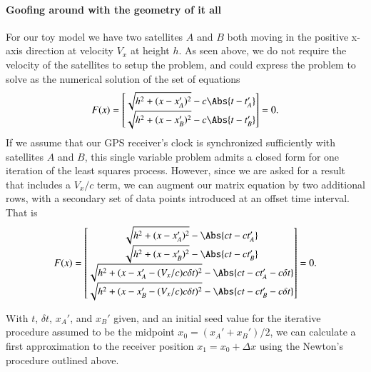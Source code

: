 \paragraph{Goofing around with the geometry of it all}
For our toy model we have two satellites \(A\) and \(B\) both moving in the positive x-axis direction at velocity \(V_x\) at height \(h\).  As seen above, we do not require the velocity of the satellites to setup the problem, and could express the problem to solve as the numerical solution of the set of equations
\begin{equation}\label{eqn:relativisticElectrodynamicsA1:350}
F(x) =
\begin{bmatrix}
\sqrt{ h^2 + (x - x_A')^2 } - c \Abs{t - t_A'} \\
\sqrt{ h^2 + (x - x_B')^2 } - c \Abs{t - t_B'} \\
\end{bmatrix} = 0.
\end{equation}
If we assume that our GPS receiver's clock is synchronized sufficiently with satellites \(A\) and \(B\), this single variable problem admits a closed form for one iteration of the least squares process.  However, since we are asked for a result that includes a \(V_x/c\) term, we can augment our matrix equation by two additional rows, with a secondary set of data points introduced at an offset time interval.  That is
\begin{equation}\label{eqn:relativisticElectrodynamicsA1:360}
F(x) =
\begin{bmatrix}
\sqrt{ h^2 + (x - x_A')^2 } - \Abs{c t - c t_A'} \\
\sqrt{ h^2 + (x - x_B')^2 } - \Abs{c t - c t_B'} \\
\sqrt{ h^2 + (x - x_A' - (V_x/c) c \delta t)^2 } - \Abs{c t - c t_A' - c \delta t} \\
\sqrt{ h^2 + (x - x_B' - (V_x/c) c \delta t)^2 } - \Abs{c t - c t_B' - c \delta t} \\
\end{bmatrix} = 0.
\end{equation}

With \(t\), \(\delta t\), \(x_A'\), and \(x_B'\) given, and an initial seed value for the iterative procedure assumed to be the midpoint \(x_0 = (x_A' + x_B')/2\), we can calculate a first approximation to the receiver position \(x_1 = x_0 + \Delta x\) using the Newton's procedure outlined above.

